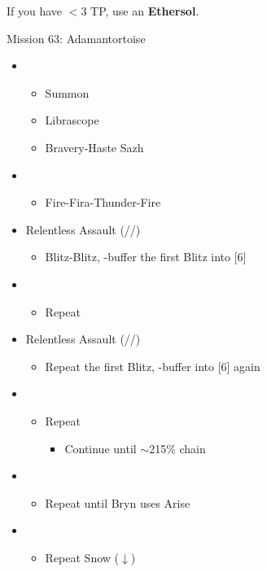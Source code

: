 \renewcommand{\third}{[3] Ruthless (\com/\rav/\sab)}
\renewcommand{\fourth}{[4] Relentless Assault (\com/\rav/\rav)}

If you have $<3$ TP, use an \textbf{Ethersol}.

\begin{battle}{Mission 63: Adamantortoise}
	\begin{itemize}
		\item \fifth
			\begin{itemize}
				\item Summon
				\item Librascope
				\item Bravery-Haste Sazh
			\end{itemize}
		\item \sixth
			\begin{itemize}
				\item Fire-Fira-Thunder-Fire
			\end{itemize}
		\item \fourth
			\begin{itemize}
				\item Blitz-Blitz, \rav-buffer the first Blitz into [6]
			\end{itemize}
		\item \sixth
			\begin{itemize}
				\item Repeat
			\end{itemize}
		\item \fourth
			\begin{itemize}
				\item Repeat the first Blitz, \rav-buffer into [6] again
			\end{itemize}
		\item \sixth
			\begin{itemize}
				\item Repeat
					\begin{itemize}
						\item Continue until $\sim$215\% chain
					\end{itemize}
			\end{itemize}
		\item \second
			\begin{itemize}
				\item Repeat until Bryn uses Arise
			\end{itemize}
		\item \fifth
			\begin{itemize}
				\item Repeat Snow ($\downarrow$)

\end{itemize}
\end{itemize}
\end{battle}
